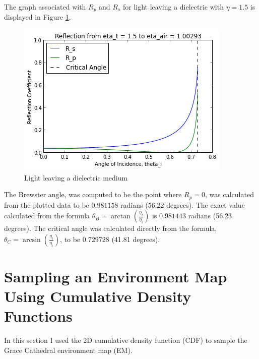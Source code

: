 \documentclass[a4paper,12pt,oneside,final]{report}
\newenvironment{changemargin}[2]{\begin{list}{}{%
\setlength{\topsep}{0pt}%
\setlength{\leftmargin}{0pt}%
\setlength{\rightmargin}{0pt}%
\setlength{\listparindent}{\parindent}%
\setlength{\itemindent}{\parindent}%
\setlength{\parsep}{0pt plus 1pt}%
\addtolength{\leftmargin}{#1}%
\addtolength{\rightmargin}{#2}%
}\item }{\end{list}}
\begin{document}
The graph associated with $R_p$ and $R_s$ for light leaving a dielectric with $\eta = 1.5$ is displayed in Figure \ref{fig:fresnel2}.
\begin{figure}[!h]
  \begin{changemargin}{-50mm}{-50mm}
    \center
    \includegraphics[scale=0.8]{fresnel2.png}
    \caption{Light leaving a dielectric medium \label{fig:fresnel2}}
  \end{changemargin}
\end{figure}
The Brewster angle, was computed to be the point where $R_p = 0$, was calculated from the plotted data to be $0.981158$ radians (56.22 degrees).  The exact value calculated from the formula $\theta_B = \arctan\left(\frac{\eta_t}{\eta_i}\right)$ is $0.981443$ radians (56.23 degrees).  The critical angle was calculated directly from the formula, $\theta_C = \arcsin\left(\frac{\eta_t}{\eta_i}\right)$, to be $0.729728$ (41.81 degrees).

\chapter{Sampling an Environment Map Using Cumulative Density Functions}
In this section I used the 2D cumulative density function (CDF) to sample the Grace Cathedral environment map (EM).
\end{document}
